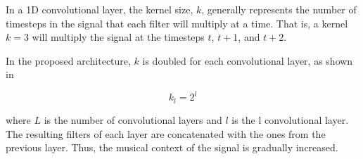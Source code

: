 
In a 1D convolutional layer, the kernel size, $k$, generally
represents the number of timesteps in the signal that each
filter will multiply at a time. That is, a kernel $k=3$ will
multiply the signal at the timesteps $t$, $t+1$, and $t+2$.

In the proposed architecture, $k$ is doubled for each
convolutional layer, as shown in 

\begin{equation}
    \label{eq:kernel_size}
    k_l = 2^{l}
\end{equation}

where $L$ is the number of convolutional layers and $l$ is
the l convolutional layer. The resulting
filters of each layer are concatenated with the ones from
the previous layer. Thus, the musical context of the signal
is gradually increased.
